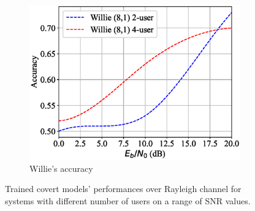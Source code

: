 \begin{figure}[tp!]
\begin{subfigure}{0.28\textwidth}
		\includegraphics[width=\linewidth]{figs/multi_willie_accuracy_rayleigh}
		\caption{Willie's accuracy}
		\label{fig:multi_rayleigh_results_willie}
	\end{subfigure}
	\caption{Trained covert models' performances over Rayleigh channel for systems with different number of users on a range of SNR values.}
	\label{fig:multi_rayleigh_results}
\end{figure}
